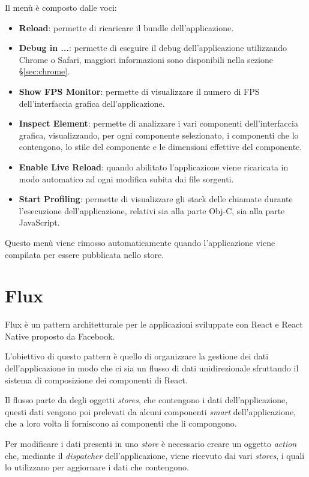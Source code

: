 Il menù è composto dalle voci:
\begin{itemize}
\item \textbf{Reload}: permette di ricaricare il bundle dell'applicazione.
\item \textbf{Debug in ...}: permette di eseguire il debug dell'applicazione utilizzando Chrome o Safari, maggiori informazioni sono disponibili nella sezione §\ref{sec:chrome}.
\item \textbf{Show FPS Monitor}: permette di visualizzare il numero di FPS dell'interfaccia grafica dell'applicazione.
\item \textbf{Inspect Element}: permette di analizzare i vari componenti dell'interfaccia grafica, visualizzando, per ogni componente selezionato, i componenti che lo contengono, lo stile del componente e le dimensioni effettive del componente.
\item \textbf{Enable Live Reload}: quando abilitato l'applicazione viene ricaricata in modo automatico ad ogni modifica subita dai file sorgenti.
\item \textbf{Start Profiling}: permette di visualizzare gli stack delle chiamate durante l'esecuzione dell'applicazione, relativi sia alla parte Obj-C, sia alla parte JavaScript. 
\end{itemize}

Questo menù viene rimosso automaticamente quando l'applicazione viene compilata per essere pubblicata nello store.

\section{Flux}\label{sec:flux}
Flux è un pattern architetturale per le applicazioni sviluppate con React e React Native proposto da Facebook.

L'obiettivo di questo pattern è quello di organizzare la gestione dei dati dell'applicazione in modo che ci sia un flusso di dati unidirezionale sfruttando il sistema di composizione dei componenti di React.

Il flusso parte da degli oggetti \textit{stores}, che contengono i dati dell'applicazione, questi dati vengono poi prelevati da alcuni  componenti \textit{smart} dell'applicazione, che a loro volta li forniscono ai componenti che li compongono.

Per modificare i dati presenti in uno \textit{store} è necessario creare un oggetto \textit{action} che, mediante il \textit{dispatcher} dell'applicazione, viene ricevuto dai vari \textit{stores}, i quali lo utilizzano per aggiornare i dati che contengono.

